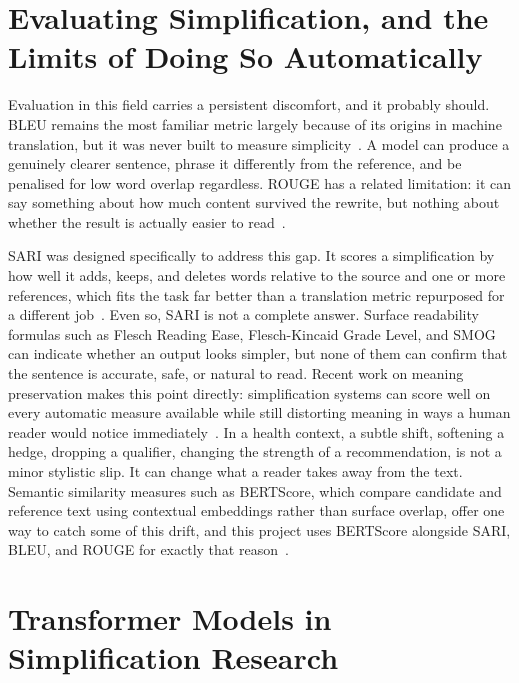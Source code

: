 \section{Evaluating Simplification, and the Limits of Doing So Automatically}
\label{sec:evaluation-lit}

Evaluation in this field carries a persistent discomfort, and it probably should. BLEU remains the most familiar metric largely because of its origins in machine translation, but it was never built to measure simplicity~\cite{papineni2002bleu}. A model can produce a genuinely clearer sentence, phrase it differently from the reference, and be penalised for low word overlap regardless. ROUGE has a related limitation: it can say something about how much content survived the rewrite, but nothing about whether the result is actually easier to read~\cite{lin2004rouge}.

SARI was designed specifically to address this gap. It scores a simplification by how well it adds, keeps, and deletes words relative to the source and one or more references, which fits the task far better than a translation metric repurposed for a different job~\cite{xu2016sari}. Even so, SARI is not a complete answer. Surface readability formulas such as Flesch Reading Ease, Flesch-Kincaid Grade Level, and SMOG can indicate whether an output looks simpler, but none of them can confirm that the sentence is accurate, safe, or natural to read. Recent work on meaning preservation makes this point directly: simplification systems can score well on every automatic measure available while still distorting meaning in ways a human reader would notice immediately~\cite{meaningpreservation2024tacl}. In a health context, a subtle shift, softening a hedge, dropping a qualifier, changing the strength of a recommendation, is not a minor stylistic slip. It can change what a reader takes away from the text. Semantic similarity measures such as BERTScore, which compare candidate and reference text using contextual embeddings rather than surface overlap, offer one way to catch some of this drift, and this project uses BERTScore alongside SARI, BLEU, and ROUGE for exactly that reason~\cite{zhang2020bertscore}.

\section{Transformer Models in Simplification Research}
\label{sec:transformers-lit}

